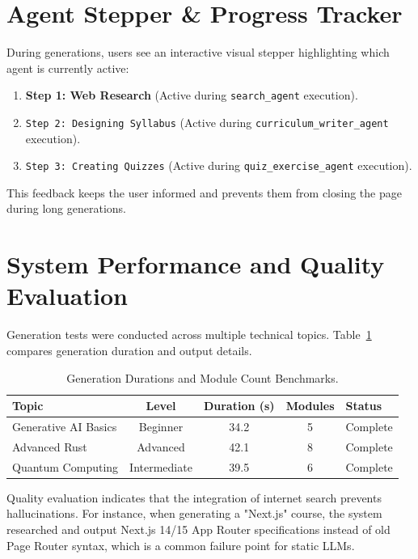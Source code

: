 \documentclass[12pt,a4paper]{report}
\begin{document}
\section{Agent Stepper & Progress Tracker}
During generations, users see an interactive visual stepper highlighting which agent is currently active:
\begin{enumerate}
    \item \textbf{Step 1: Web Research} (Active during \texttt{search\_agent} execution).
    \item \texttt{Step 2: Designing Syllabus} (Active during \texttt{curriculum\_writer\_agent} execution).
    \item \texttt{Step 3: Creating Quizzes} (Active during \texttt{quiz\_exercise\_agent} execution).
\end{enumerate}
This feedback keeps the user informed and prevents them from closing the page during long generations.

\section{System Performance and Quality Evaluation}
Generation tests were conducted across multiple technical topics. Table~\ref{tab:benchmarks} compares generation duration and output details.

\begin{table}[h]
\centering
\begin{tabular}{lcccl}
\toprule
\textbf{Topic} & \textbf{Level} & \textbf{Duration (s)} & \textbf{Modules} & \textbf{Status} \\
\midrule
Generative AI Basics & Beginner & 34.2 & 5 & Complete \\
Advanced Rust & Advanced & 42.1 & 8 & Complete \\
Quantum Computing & Intermediate & 39.5 & 6 & Complete \\
\bottomrule
\end{tabular}
\caption{Generation Durations and Module Count Benchmarks.}
\label{tab:benchmarks}
\end{table}

Quality evaluation indicates that the integration of internet search prevents hallucinations. For instance, when generating a "Next.js" course, the system researched and output Next.js 14/15 App Router specifications instead of old Page Router syntax, which is a common failure point for static LLMs.

\end{document}

